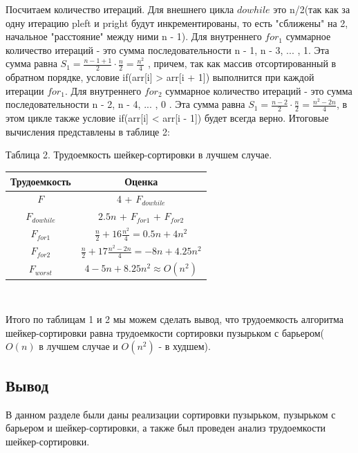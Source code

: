 \documentclass[a4paper, 14pt]{article}
\begin{document}
		Посчитаем количество итераций. Для внешнего цикла $do while$ это n/2(так как за одну итерацию pleft и pright будут инкрементированы, то есть "сближены" на 2, начальное "расстояние" между ними n - 1). Для внутреннего $for_{1}$ суммарное количество итераций - это сумма последовательности n - 1, n - 3, ... , 1. Эта сумма равна $S_{1} = \frac{n - 1 + 1}{2}\cdot \frac{n}{2} = \frac{n^2}{4}$ , причем, так как массив отсортированный в обратном порядке, условие if(arr[i] > arr[i + 1]) выполнится при каждой итерации $for_{1}$.  Для внутреннего $for_{2}$ суммарное количество итераций - это сумма последовательности n - 2, n - 4, ... , 0 . Эта сумма равна $S_{1} = \frac{n - 2}{2}\cdot \frac{n}{2} = \frac{n^2 - 2n}{4}$, в этом цикле также условие if(arr[i] < arr[i - 1]) будет всегда верно. Итоговые вычисления представлены в таблице 2:\\
        	\begin{center}
  	Таблица 2. Трудоемкость шейкер-сортировки в лучшем случае.\\
  		
		\begin{tabular}{ | c | c | }
        \hline
		Трудоемкость & Оценка\\ \hline
		$F$ & 4 + $F_{dowhile}$\\ \hline
		$F_{dowhile}$ & $2.5n$ + $F_{for1}$ + $F_{for2}$\\ \hline
		$F_{for1}$ & $\frac{n}{2} + 16\frac{n^2}{4} = 0.5n + 4n^2$\\ \hline
		$F_{for2}$ & $\frac{n}{2} + 17\frac{n^2 - 2n}{4} = -8n + 4.25n^2$\\ \hline
		\textbf{$F_{worst}$} & \textbf{$4 - 5n + 8.25n^2 \approx O(n^2)$}\\ \hline
		\hline
        \end{tabular}\\
        \end{center}
        Итого по таблицам 1 и 2 мы можем сделать вывод, что трудоемкость алгоритма шейкер-сортировки равна трудоемкости сортировки пузырьком с барьером($O(n)$ в лучшем случае и $O(n^2)$ - в худшем).
   \subsection{Вывод}
   В данном разделе были даны реализации сортировки пузырьком, пузырьком с барьером и шейкер-сортировки, а также был проведен анализ трудоемкости шейкер-сортировки. 
   

       	\newpage
       	
\end{document}
